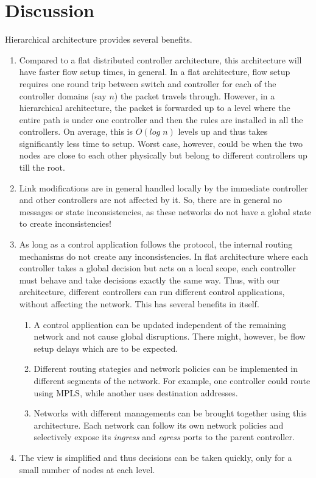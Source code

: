 \documentclass[10pt, twocolumn]{article}
\begin{document}
\section{Discussion}
\label{sec:discuss}
Hierarchical architecture provides several benefits.
\begin{enumerate}
    \item Compared to a flat distributed controller architecture, this architecture will have faster flow setup times, in general. In a flat architecture, flow setup requires one round trip between switch and controller for each of the controller domains (say $n$) the packet travels through. However, in a hierarchical architecture, the packet is forwarded up to a level where the entire path is under one controller and then the rules are installed in all the controllers. On average, this is $O(log\;n)$ levels up and thus takes significantly less time to setup. Worst case, however, could be when the two nodes are close to each other physically but belong to different controllers up till the root.
    \item Link modifications are in general handled locally by the immediate controller and other controllers are not affected by it. So, there are in general no messages or state inconsistencies, as these networks do not have a global state to create inconsistencies!
    \item As long as a control application follows the protocol, the internal routing mechanisms do not create any inconsistencies. In flat architecture where each controller takes a global decision but acts on a local scope, each controller must behave and take decisions exactly the same way. Thus, with our architecture, different controllers can run different control applications, without affecting the network. This has several benefits in itself.
        \begin{enumerate}
            \item A control application can be updated independent of the remaining network and not cause global disruptions. There might, however, be flow setup delays which are to be expected.
            \item Different routing stategies and network policies can be implemented in different segments of the network. For example, one controller could route using MPLS, while another uses destination addresses.
            \item Networks with different managements can be brought together using this architecture. Each network can follow its own network policies and selectively expose its \emph{ingress} and \emph{egress} ports to the parent controller.
        \end{enumerate}
    \item The view is simplified and thus decisions can be taken quickly, only for a small number of nodes at each level.
\end{enumerate}
\end{document}
